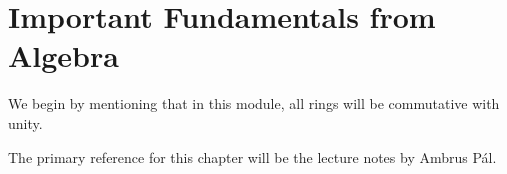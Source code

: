 \chapter{Important Fundamentals from Algebra}

We begin by mentioning that in this module, all rings will be commutative with unity.

The primary reference for this chapter will be the lecture notes by Ambrus Pál.


